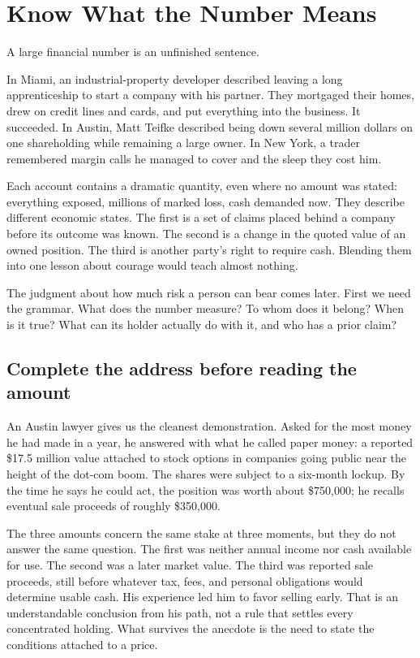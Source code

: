 \chapter{Know What the Number Means}

A large financial number is an unfinished sentence.

In Miami, an industrial-property developer described leaving a long apprenticeship
to start a company with his partner. They mortgaged their homes, drew on credit
lines and cards, and put everything into the business. It succeeded. In Austin,
Matt Teifke described being down several million dollars on one shareholding
while remaining a large owner. In New York, a trader remembered margin calls he
managed to cover and the sleep they cost him.

Each account contains a dramatic quantity, even where no amount was stated:
everything exposed, millions of marked loss, cash demanded now. They describe
different economic states. The first is a set of claims placed behind a company
before its outcome was known. The second is a change in the quoted value of an
owned position. The third is another party's right to require cash. Blending
them into one lesson about courage would teach almost nothing.

The judgment about how much risk a person can bear comes later. First we need
the grammar. What does the number measure? To whom does it belong? When is it
true? What can its holder actually do with it, and who has a prior claim?

\section{Complete the address before reading the amount}

An Austin lawyer gives us the cleanest demonstration. Asked for the most money
he had made in a year, he answered with what he called paper money: a reported
\$17.5 million value attached to stock options in companies going public near
the height of the dot-com boom. The shares were subject to a six-month lockup.
By the time he says he could act, the position was worth about \$750,000; he
recalls eventual sale proceeds of roughly \$350,000.

The three amounts concern the same stake at three moments, but they do not answer
the same question. The first was neither annual income nor cash available for
use. The second was a later market value. The third was reported sale proceeds,
still before whatever tax, fees, and personal obligations would determine usable
cash. His experience led him to favor selling early. That is an understandable
conclusion from his path, not a rule that settles every concentrated holding.
What survives the anecdote is the need to state the conditions attached to a
price.

